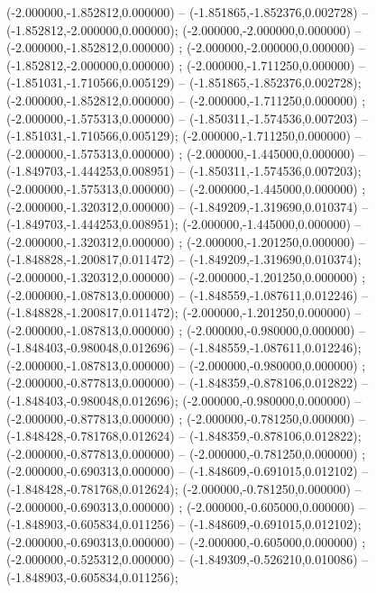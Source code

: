  (-2.000000,-1.852812,0.000000) -- (-1.851865,-1.852376,0.002728) -- (-1.852812,-2.000000,0.000000);
 (-2.000000,-2.000000,0.000000) -- (-2.000000,-1.852812,0.000000) ;
 (-2.000000,-2.000000,0.000000) -- (-1.852812,-2.000000,0.000000) ;
 (-2.000000,-1.711250,0.000000) -- (-1.851031,-1.710566,0.005129) -- (-1.851865,-1.852376,0.002728);
 (-2.000000,-1.852812,0.000000) -- (-2.000000,-1.711250,0.000000) ;
 (-2.000000,-1.575313,0.000000) -- (-1.850311,-1.574536,0.007203) -- (-1.851031,-1.710566,0.005129);
 (-2.000000,-1.711250,0.000000) -- (-2.000000,-1.575313,0.000000) ;
 (-2.000000,-1.445000,0.000000) -- (-1.849703,-1.444253,0.008951) -- (-1.850311,-1.574536,0.007203);
 (-2.000000,-1.575313,0.000000) -- (-2.000000,-1.445000,0.000000) ;
 (-2.000000,-1.320312,0.000000) -- (-1.849209,-1.319690,0.010374) -- (-1.849703,-1.444253,0.008951);
 (-2.000000,-1.445000,0.000000) -- (-2.000000,-1.320312,0.000000) ;
 (-2.000000,-1.201250,0.000000) -- (-1.848828,-1.200817,0.011472) -- (-1.849209,-1.319690,0.010374);
 (-2.000000,-1.320312,0.000000) -- (-2.000000,-1.201250,0.000000) ;
 (-2.000000,-1.087813,0.000000) -- (-1.848559,-1.087611,0.012246) -- (-1.848828,-1.200817,0.011472);
 (-2.000000,-1.201250,0.000000) -- (-2.000000,-1.087813,0.000000) ;
 (-2.000000,-0.980000,0.000000) -- (-1.848403,-0.980048,0.012696) -- (-1.848559,-1.087611,0.012246);
 (-2.000000,-1.087813,0.000000) -- (-2.000000,-0.980000,0.000000) ;
 (-2.000000,-0.877813,0.000000) -- (-1.848359,-0.878106,0.012822) -- (-1.848403,-0.980048,0.012696);
 (-2.000000,-0.980000,0.000000) -- (-2.000000,-0.877813,0.000000) ;
 (-2.000000,-0.781250,0.000000) -- (-1.848428,-0.781768,0.012624) -- (-1.848359,-0.878106,0.012822);
 (-2.000000,-0.877813,0.000000) -- (-2.000000,-0.781250,0.000000) ;
 (-2.000000,-0.690313,0.000000) -- (-1.848609,-0.691015,0.012102) -- (-1.848428,-0.781768,0.012624);
 (-2.000000,-0.781250,0.000000) -- (-2.000000,-0.690313,0.000000) ;
 (-2.000000,-0.605000,0.000000) -- (-1.848903,-0.605834,0.011256) -- (-1.848609,-0.691015,0.012102);
 (-2.000000,-0.690313,0.000000) -- (-2.000000,-0.605000,0.000000) ;
 (-2.000000,-0.525312,0.000000) -- (-1.849309,-0.526210,0.010086) -- (-1.848903,-0.605834,0.011256);
